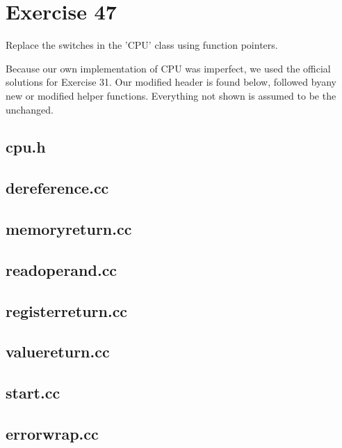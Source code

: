 \section{Exercise 47}
\begin{question}
Replace the switches in the 'CPU' class using function pointers.
\end{question}

\begin{solution}
    Because our own implementation of CPU was imperfect, we used the official solutions for Exercise 31.
    Our modified header is found below, followed byany new or modified helper functions. Everything not shown is assumed to be the unchanged.
    \subsection{cpu.h}

    \subsection{dereference.cc}
    \subsection{memoryreturn.cc}
    \subsection{readoperand.cc}
    \subsection{registerreturn.cc}
    \subsection{valuereturn.cc}

    \subsection{start.cc}
    \subsection{errorwrap.cc}

\end{solution}
